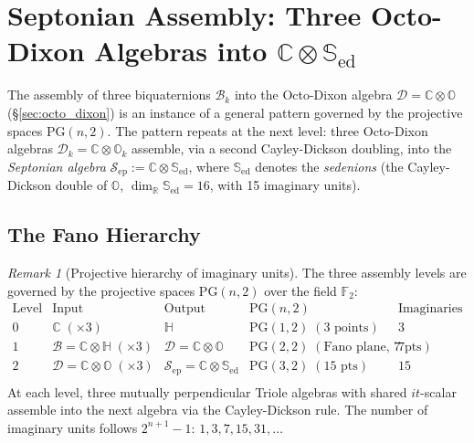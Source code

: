 \documentclass[12pt,a4paper]{article}
\theoremstyle{remark}
\newtheorem*{remark}{Remark}
\begin{document}
\section{Septonian Assembly: Three Octo-Dixon Algebras into
  $\mathbb{C}\otimes\mathbb{S}_{\mathrm{ed}}$}
\label{sec:septonian}

The assembly of three biquaternions $\mathcal{B}_k$ into the Octo-Dixon
algebra $\mathcal{D}=\mathbb{C}\otimes\mathbb{O}$
(\S\ref{sec:octo_dixon}) is an instance of a general pattern governed
by the projective spaces $\mathrm{PG}(n,2)$.
The pattern repeats at the next level: three Octo-Dixon algebras
$\mathcal{D}_k=\mathbb{C}\otimes\mathbb{O}_k$ assemble, via a second
Cayley-Dickson doubling, into the \emph{Septonian algebra}
$\mathcal{S}_{\mathrm{ep}}:=\mathbb{C}\otimes\mathbb{S}_{\mathrm{ed}}$,
where $\mathbb{S}_{\mathrm{ed}}$ denotes the \emph{sedenions}
(the Cayley-Dickson double of $\mathbb{O}$, $\dim_{\mathbb{R}}\mathbb{S}_{\mathrm{ed}}=16$,
with 15 imaginary units).

\subsection*{The Fano Hierarchy}

\begin{remark}[Projective hierarchy of imaginary units]
\label{rem:fano_hierarchy}
The three assembly levels are governed by the projective spaces
$\mathrm{PG}(n,2)$ over the field $\mathbb{F}_2$:
\[
\begin{array}{ccccc}
\text{Level} & \text{Input} & \text{Output} & \mathrm{PG}(n,2) &
  \text{Imaginaries}\\
\hline
0 & \mathbb{C}\;(\times 3) & \mathbb{H} & \mathrm{PG}(1,2)\;(\text{3 points}) & 3\\
1 & \mathcal{B}=\mathbb{C}\otimes\mathbb{H}\;(\times 3) & \mathcal{D}=\mathbb{C}\otimes\mathbb{O} & \mathrm{PG}(2,2)\;(\text{Fano plane, 7 pts}) & 7\\
2 & \mathcal{D}=\mathbb{C}\otimes\mathbb{O}\;(\times 3) & \mathcal{S}_{\mathrm{ep}}=\mathbb{C}\otimes\mathbb{S}_{\mathrm{ed}} & \mathrm{PG}(3,2)\;(\text{15 pts}) & 15\\
\end{array}
\]
At each level, three mutually perpendicular Triole algebras with shared
$it$-scalar assemble into the next algebra via the Cayley-Dickson rule.
The number of imaginary units follows $2^{n+1}-1$: $1,3,7,15,31,\ldots$
\end{remark}
\end{document}
